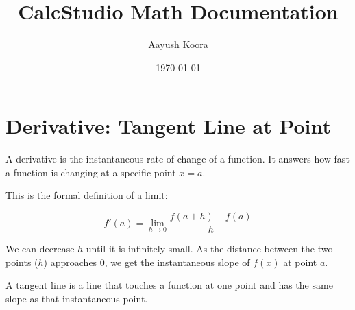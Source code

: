 \documentclass{article}
\title{CalcStudio Math Documentation}
\author{Aayush Koora}
\date{\today}
\begin{document}
\maketitle

\newpage
\section{Derivative: Tangent Line at Point}

\noindent
A derivative is the instantaneous rate of change of a function. It answers how fast a function is changing at a specific point \( x = a \).

\vspace{1em}

This is the formal definition of a limit:

\vspace{1em}

\begin{equation}
f'(a) = \lim_{h \to 0} \frac{f(a + h) - f(a)}{h}
\end{equation}

\vspace{1.5em}

\begin{center}
\end{center}

\vspace{1.5em}

\noindent
We can decrease \( h \) until it is infinitely small. As the distance between the two points (\( h \)) approaches 0, we get the instantaneous slope of \( f(x) \) at point \( a \).

\vspace{1em}

\noindent
A tangent line is a line that touches a function at one point and has the same slope as that instantaneous point.

\vspace{1em}
\end{document}
